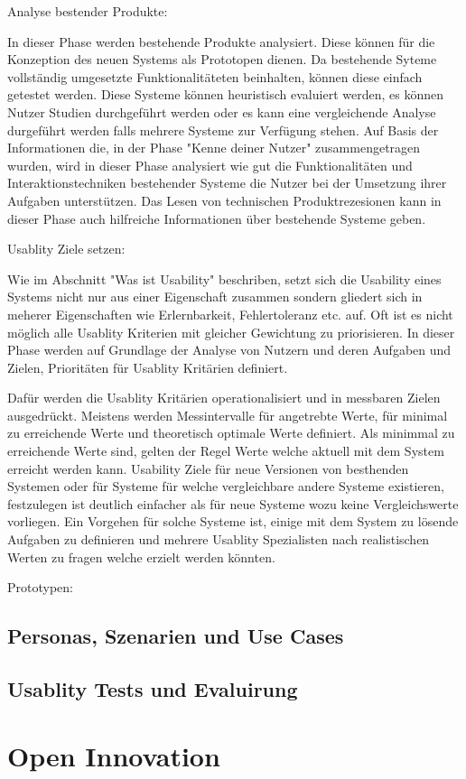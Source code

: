 Analyse bestender Produkte: 

In dieser Phase werden bestehende Produkte analysiert. Diese können für die Konzeption des neuen Systems als Prototopen dienen. Da bestehende Syteme vollständig 
umgesetzte Funktionalitäteten beinhalten, können diese einfach getestet werden.    
Diese Systeme können heuristisch evaluiert werden, es können Nutzer Studien durchgeführt werden oder es kann eine vergleichende Analyse durgeführt werden falls mehrere Systeme zur 
Verfügung stehen. Auf Basis der Informationen die, in der Phase "Kenne deiner Nutzer" zusammengetragen wurden, wird in dieser Phase analysiert wie gut die  Funktionalitäten und Interaktionstechniken 
bestehender Systeme die Nutzer bei der Umsetzung ihrer Aufgaben unterstützen. Das Lesen von technischen Produktrezesionen kann in dieser Phase auch hilfreiche Informationen über bestehende Systeme geben. 

Usablity Ziele setzen: 

Wie im Abschnitt "Was ist Usability" beschriben, setzt sich die Usability eines Systems nicht nur aus einer Eigenschaft zusammen sondern gliedert sich in meherer Eigenschaften wie Erlernbarkeit, Fehlertoleranz etc. auf. 
Oft ist es nicht möglich alle Usablity Kriterien mit gleicher Gewichtung zu priorisieren. In dieser Phase werden auf Grundlage der Analyse von Nutzern und deren Aufgaben und Zielen,  Prioritäten für Usablity Kritärien definiert. 

Dafür werden die Usablity Kritärien operationalisiert und in messbaren Zielen ausgedrückt. Meistens werden Messintervalle für angetrebte Werte, für minimal zu erreichende Werte 
und theoretisch optimale Werte definiert. Als minimmal zu erreichende Werte sind, gelten der Regel Werte welche aktuell mit dem System erreicht werden kann. Usability Ziele für neue Versionen von besthenden Systemen 
oder für Systeme für welche vergleichbare andere Systeme existieren, festzulegen ist deutlich einfacher als für neue Systeme wozu keine Vergleichswerte vorliegen. Ein Vorgehen für solche Systeme ist, einige mit dem 
System zu lösende Aufgaben zu definieren und mehrere Usablity Spezialisten nach realistischen Werten zu fragen welche erzielt werden könnten.

Prototypen:




\subsection{Personas, Szenarien und Use Cases}




\subsection{Usablity Tests und Evaluirung}

\section{Open Innovation}




